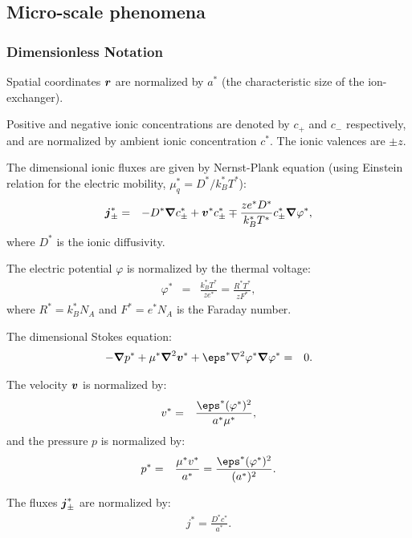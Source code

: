 \subsection{Micro-scale phenomena}

\subsubsection{Dimensionless Notation}

Spatial coordinates $\boldsymbol{r}$ are normalized by $a^*$ (the characteristic size of the ion-exchanger).

Positive and negative ionic concentrations are denoted by $c_+$ and $c_-$ respectively, and
are normalized by ambient ionic concentration $c^*$. The ionic valences are $\pm z$.

The dimensional ionic fluxes are given by Nernst-Plank equation 
(using Einstein relation for the electric mobility, $\mu_q^* = D^* / k_B^* T^*$):
\begin{eqnarray}
\boldsymbol{j}^*_\pm &=& 
-D^* \boldsymbol{\nabla} c^*_\pm + \boldsymbol{v}^* c^*_\pm \mp \frac{z e^* D^*}{k_B^* T^*} c^*_\pm \boldsymbol{\nabla} \varphi^*,
\end{eqnarray}
where $D^*$ is the ionic diffusivity.

The electric potential $\varphi$ is normalized by the thermal voltage:
\begin{eqnarray}
\varphi^* &=& \frac{k_B^* T^*}{z e^*} = \frac{R^* T^*}{z F^*},
\end{eqnarray}
where $R^* = k_B^* N_A$ and $F^* = e^* N_A$ is the Faraday number.

The dimensional Stokes equation:
\begin{eqnarray}
-\bnabla p^* + \mu^* \bLaplacian \bv^* + \eps^* \Laplacian \varphi^* \bnabla \varphi^* &=& 0.
\end{eqnarray}

The velocity $\boldsymbol{v}$ is normalized by:
\begin{eqnarray}
v^* &=& \frac{\eps^* (\varphi^*)^2}{a^* \mu^*},
\end{eqnarray}
and the pressure $p$ is normalized by:
\begin{eqnarray}
p^* &=& \frac{\mu^* v^*}{a^*} = \frac{\eps^* (\varphi^*)^2}{(a^*)^2}.
\end{eqnarray}

The fluxes $\boldsymbol{j}^*_\pm$ are normalized by:
\begin{eqnarray}
j^* = \frac{D^* c^*}{a^*}.
\end{eqnarray}

